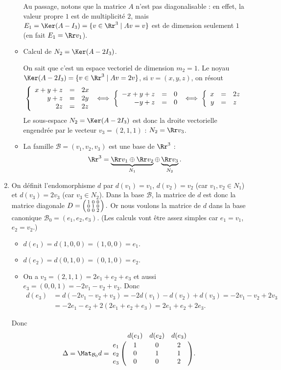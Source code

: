 \documentclass[12pt, class=report,crop=false]{standalone}
\begin{document}
\begin{exemple}
\begin{enumerate}
\begin{itemize}
Au passage, notons que la matrice $A$ n'est pas diagonalisable : en effet,
la valeur propre $1$ est de multiplicité $2$, mais 
$E_1 = \Ker(A-I_3) =\{v \in \Rr^3 \mid Av=v\}$ est de dimension seulement $1$ (en fait
$E_1 = \Rr v_1$).

    \item Calcul de $N_2 = \Ker(A-2I_3)$.
    
    On sait que c'est un espace vectoriel de dimension $m_2=1$.
    Le noyau $\Ker(A-2I_3)=\{v\in \Rr^3 \mid Av=2v\}$, si $v=(x,y,z)$, on résout
$$\left\{\begin{array}{rcl}
x+y+z&=& 2x\cr
y+z&=&2y\cr
2z&=&2z
\end{array}\right.\iff\left\{\begin{array}{rcl}
-x+y+z&=&0\cr
-y+z&=&0
\end{array}\right.\iff\left\{\begin{array}{rcl}
x&=&2z\cr
y&=& z
\end{array}\right.$$
Le sous-espace $N_2=\Ker(A-2I_3)$ est donc la droite vectorielle engendrée par le vecteur $v_3=(2,1,1)$ :
$N_2 = \Rr v_3$.


    
    \item La famille $\mathcal{B} = (v_1,v_2,v_3)$ est une base de $\Rr^3$ :
    $$\Rr^3 = \underbrace{\Rr v_1 \oplus \Rr v_2}_{N_1} \oplus \underbrace{\Rr v_3}_{N_2}.$$
  
  \end{itemize}

  \item 
  On définit l'endomorphisme $d$  par $d(v_1)=v_1$, $d(v_2)= v_2$ (car $v_1,v_2 \in N_1$)
  et $d(v_3) = 2v_3$ (car $v_3 \in N_2$).
  Dans la base $\mathcal{B}$, la matrice de $d$ est donc la matrice diagonale
  $D = \left(\begin{smallmatrix}1&0&0\cr 0&1&0\cr 0&0&2\end{smallmatrix}\right).$
  Or nous voulons la matrice de $d$ dans la base canonique $\mathcal{B}_0 
  = (e_1,e_2,e_3)$. (Les calculs vont être assez simples car $e_1=v_1$, $e_2=v_2$.)
  
  \begin{itemize}
    \item $d(e_1) = d(1,0,0) = (1,0,0) = e_1$.
    \item $d(e_2) = d(0,1,0) = (0,1,0) = e_2$.
    \item On a $v_3 = (2,1,1) = 2e_1+e_2+e_3$ et aussi $e_3 = (0,0,1) = -2v_1-v_2+v_3$.
    Donc 
    \begin{align*}
    d(e_3) &= d(-2v_1-v_2+v_3) 
    = -2d(v_1)-d(v_2) +d(v_3)
    = -2v_1-v_2+2v_3 \\
    &= -2e_1-e_2+2(2e_1+e_2+e_3)
    = 2e_1 + e_2 + 2e_3.
    \end{align*}
  \end{itemize}
    Donc
    $$\Delta = \Mat_{\mathcal{B}_0} d = 
    \bordermatrix{
       &d(e_1)&d(e_2)&d(e_3)\cr
    e_1&1&0&2\cr 
    e_2&0&1&1\cr 
    e_3&0&0&2
    }
    .$$
    

\end{enumerate}
\end{exemple}
\end{document}
